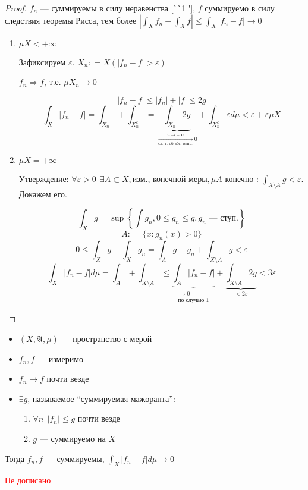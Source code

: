 \begin{proof}
    \(f_n\) --- суммируемы в силу неравенства \eqref{``1''}, \(f\) суммируемо в силу следствия теоремы Рисса, тем более \(|\int_X f_n - \int_X f| \leq  \int_X |f_n - f| \to 0\)

    \begin{enumerate}
        \item \(\mu X < +\infty\)

              Зафиксируем \(\varepsilon\). \(X_n : = X(|f_n - f| > \varepsilon)\)

              \(f_n \Rightarrow f\), т.е. \(\mu X_n \to 0\)

              \[|f_n - f| \leq |f_n| + |f| \leq 2g\]
              \[\int_X |f_n - f| = \int_{X_n} + \int_{X_n^c} = \underbrace{\int_{X_n} 2g}_{\xrightarrow[\text{сл. т. об абс. непр.}]{n \to +\infty} 0} + \int_{X_n^c} \varepsilon d\mu < \varepsilon + \varepsilon \mu X\]

        \item \(\mu X = +\infty\)

              Утверждение: \(\forall \varepsilon > 0 \ \ \exists A \subset X, \text{изм., конечной меры}, \mu A \text{ конечно : } \int_{X\setminus A} g < \varepsilon\). Докажем его.

              \[\int_X g = \sup \left\{\int g_n, 0 \leq g_n \leq g, g_n \text{ --- ступ.}\right\} \]
              \[A : = \{x : g_n(x) > 0\}\]
              \[0 \leq \int_X g - \int_X g_n = \int_A g - g_n + \int_{X\setminus A} g < \varepsilon\]
              \[\int_X |f_n - f| d\mu = \int_A + \int_{X\setminus A} \leq \underbrace{\int_A |f_n - f|}_{\substack{ \to 0 \\ \text{по случаю 1}}} + \underbrace{\int_{X\setminus A} 2g}_{ < 2\varepsilon} < 3 \varepsilon\]
    \end{enumerate}
\end{proof}

\begin{theorem}[Лебега]\itemfix
    \begin{itemize}
        \item \((X, \mathfrak{A}, \mu)\) --- пространство с мерой
        \item \(f_n, f\) --- измеримо
        \item \(f_n \to f\) почти везде
        \item \(\exists g\), называемое ``суммируемая мажоранта'':
              \begin{enumerate}
                  \item \(\forall n \ \ |f_n| \leq g\) почти везде
                  \item \(g\) --- суммируемо на \(X\)
              \end{enumerate}
    \end{itemize}

    Тогда \(f_n, f\) --- суммируемы, \(\int_X |f_n - f| d\mu \to 0\)
\end{theorem}

\textcolor{red}{Не дописано}

